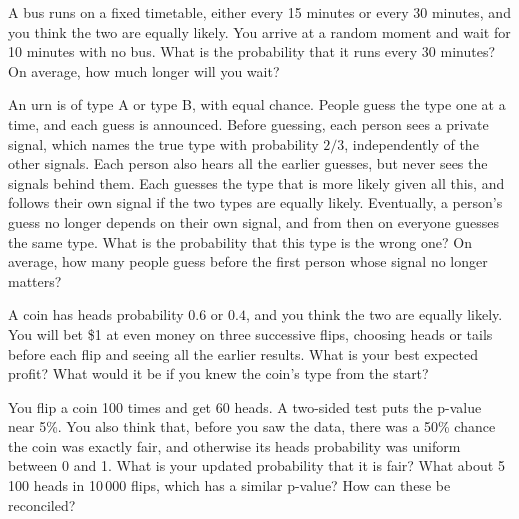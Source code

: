 \begin{question}\label{iq:iv1:conditional-probability-and-bayes:35}
A bus runs on a fixed timetable, either every 15 minutes or every 30 minutes, and you think the two are equally likely. You arrive at a random moment and wait for 10 minutes with no bus. What is the probability that it runs every 30 minutes? On average, how much longer will you wait?
\end{question}

\begin{question}\label{iq:iv1:conditional-probability-and-bayes:36}
An urn is of type A or type B, with equal chance. People guess the type one at a time, and each guess is announced. Before guessing, each person sees a private signal, which names the true type with probability $2/3$, independently of the other signals. Each person also hears all the earlier guesses, but never sees the signals behind them. Each guesses the type that is more likely given all this, and follows their own signal if the two types are equally likely. Eventually, a person's guess no longer depends on their own signal, and from then on everyone guesses the same type. What is the probability that this type is the wrong one? On average, how many people guess before the first person whose signal no longer matters?
\end{question}

\begin{question}\label{iq:iv1:conditional-probability-and-bayes:37}
A coin has heads probability $0.6$ or $0.4$, and you think the two are equally likely. You will bet \$1 at even money on three successive flips, choosing heads or tails before each flip and seeing all the earlier results. What is your best expected profit? What would it be if you knew the coin's type from the start?
\end{question}

\begin{question}\label{iq:iv1:conditional-probability-and-bayes:38}
You flip a coin 100 times and get 60 heads. A two-sided test puts the p-value near 5\%. You also think that, before you saw the data, there was a 50\% chance the coin was exactly fair, and otherwise its heads probability was uniform between 0 and 1. What is your updated probability that it is fair? What about 5\,100 heads in 10\,000 flips, which has a similar p-value? How can these be reconciled?
\end{question}

